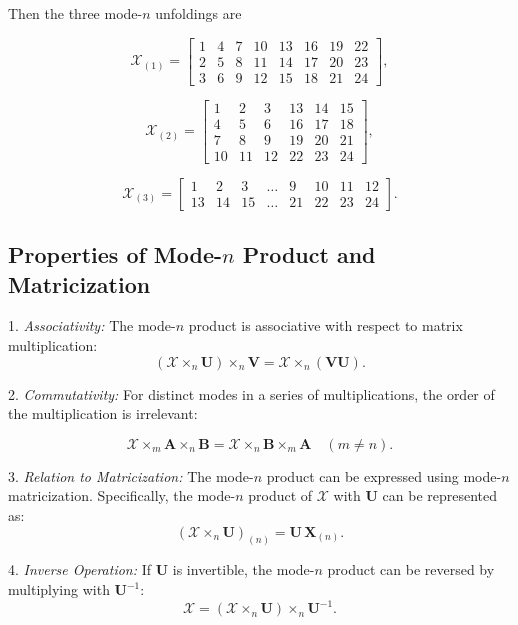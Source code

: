 \documentclass[a4paper,14pt]{article}
\theoremstyle{plain} %
\theoremstyle{definition} %
\theoremstyle{remark} %
\theoremstyle{definition}
\theoremstyle{remark}
\theoremstyle{remark}
\begin{document}
	Then the three mode-\( n \) unfoldings are
	
	\[
	\mathcal{X}_{(1)} = 
	\begin{bmatrix}
		1 & 4 & 7 & 10 & 13 & 16 & 19 & 22 \\
		2 & 5 & 8 & 11 & 14 & 17 & 20 & 23 \\
		3 & 6 & 9 & 12 & 15 & 18 & 21 & 24 
	\end{bmatrix}
	,
	\]
	
	\[
	\mathcal{X}_{(2)} = 
	\begin{bmatrix}
		1 & 2 & 3 & 13 & 14 & 15 \\
		4 & 5 & 6 & 16 & 17 & 18 \\
		7 & 8 & 9 & 19 & 20 & 21 \\
		10 & 11 & 12 & 22 & 23 & 24 
	\end{bmatrix}
	,
	\]
	
	\[
	\mathcal{X}_{(3)} = 
	\begin{bmatrix}
		1 & 2 & 3 & \dots & 9 & 10 & 11 & 12 \\
		13 & 14 & 15 & \dots & 21 & 22 & 23 & 24 
	\end{bmatrix}.
	\]
	
	\subsection{Properties of Mode-\( n \) Product and Matricization}
	
	1. \textit{Associativity:} The mode-\( n \) product is associative with respect to matrix multiplication:
	\[
	(\mathcal{X} \times_n \mathbf{U}) \times_n \mathbf{V} = \mathcal{X} \times_n (\mathbf{V} \mathbf{U}).
	\]
	
	2. \textit{Commutativity:} For distinct modes
	in a series of multiplications, the order of the multiplication is irrelevant:
	
	\[
	\mathcal{X} \times_m \mathbf{A} \times_n \mathbf{B} = \mathcal{X} \times_n \mathbf{B} \times_m \mathbf{A} \quad (m \neq n).
	\]
	
	3. \textit{Relation to Matricization:} The mode-\( n \) product can be expressed using mode-\( n \) matricization. Specifically, the mode-\( n \) product of \(\mathcal{X}\) with \(\mathbf{U}\) can be represented as:
	\[
	(\mathcal{X} \times_n \mathbf{U})_{(n)} = \mathbf{U} \, \mathbf{X}_{(n)}.
	\]
	
	4. \textit{Inverse Operation:} If \(\mathbf{U}\) is invertible, the mode-\( n \) product can be reversed by multiplying with \(\mathbf{U}^{-1}\):
	\[
	\mathcal{X} = (\mathcal{X} \times_n \mathbf{U}) \times_n \mathbf{U}^{-1}.
	\]
	
\end{document}
